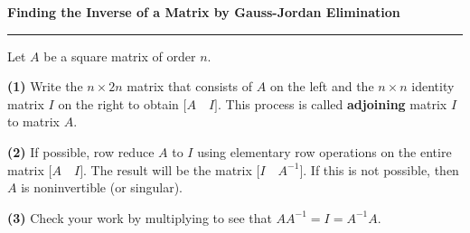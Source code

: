 \nopagenumbers
{\bf Finding the Inverse of a Matrix by Gauss-Jordan Elimination}
\vskip 1mm
\hrule

\vskip 6pt
Let $A$ be a square matrix of order $n$.

\vskip 6pt
{\bf (1)} Write the $n\times 2n$ matrix that consists of $A$ on the left and the $n\times n$ identity matrix $I$ on the right to obtain $\bigl\lbrack A\quad I\bigr\rbrack$. This process is called {\bf adjoining} matrix $I$ to matrix $A$.

\vskip 6pt
{\bf (2)} If possible, row reduce $A$ to $I$ using elementary row operations on the entire matrix $\bigl\lbrack A\quad I\bigr\rbrack$. The result will be the matrix $\bigl\lbrack I\quad A^{-1}\bigr\rbrack$. If this is not possible, then $A$ is noninvertible (or singular).

\vskip 6pt
{\bf (3)} Check your work by multiplying to see that $AA^{-1}=I=A^{-1}A$.

\vfill\eject
\bye
